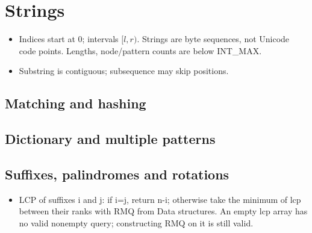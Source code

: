 \chapter{Strings}
\begin{itemize}[nosep,leftmargin=*]
\item Indices start at 0; intervals $[l,r)$. Strings are byte sequences,
 not Unicode code points. Lengths, node/pattern counts are below INT\_MAX.
\item Substring is contiguous; subsequence may skip positions.
\end{itemize}
\section{Matching and hashing}
\section{Dictionary and multiple patterns}
\section{Suffixes, palindromes and rotations}
\begin{itemize}[nosep,leftmargin=*]
\item LCP of suffixes i and j: if i=j, return n-i; otherwise take the minimum
 of lcp between their ranks with RMQ from Data structures. An empty lcp array
 has no valid nonempty query; constructing RMQ on it is still valid.
\end{itemize}
\par
